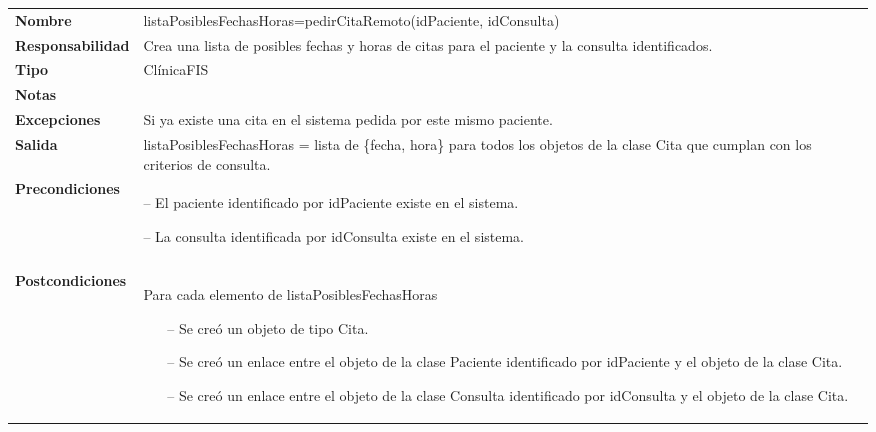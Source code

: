 
 \begin{table}[H]
  \centering
  \begin{tabularx}{\textwidth}{l|X}
    \textbf{Nombre}        &  listaPosiblesFechasHoras=pedirCitaRemoto(idPaciente, idConsulta) \\ 
    \textbf{Responsabilidad}  &  Crea una lista de posibles fechas y horas de citas para el paciente y la consulta identificados. \\ 
    \textbf{Tipo}        &  ClínicaFIS \\ 
    \textbf{Notas}        &  \\ 
    \textbf{Excepciones}    & Si ya existe una cita en el sistema pedida por este mismo paciente. \\ 
    \textbf{Salida}        &  listaPosiblesFechasHoras = lista de \{fecha, hora\} para todos los objetos de la clase Cita que cumplan con los criterios de consulta. \\ 
    \textbf{Precondiciones}    &
    \begin{itemizenomargins}
    \item[--] El paciente identificado por idPaciente existe en el sistema.
    \item[--] La consulta identificada por idConsulta existe en el sistema.
    \end{itemizenomargins} \\ \\
    \textbf{Postcondiciones}  & Para cada elemento de listaPosiblesFechasHoras
     \begin{itemize}
    \item[--] Se creó un objeto de tipo Cita.
    \item[--] Se creó un enlace entre el objeto de la clase Paciente identificado
      por idPaciente y el objeto de la clase Cita.
    \item[--] Se creó un enlace entre el objeto de la clase Consulta identificado
      por idConsulta y el objeto de la clase Cita.
    \end{itemize}
  \end{tabularx}
\end{table}
 